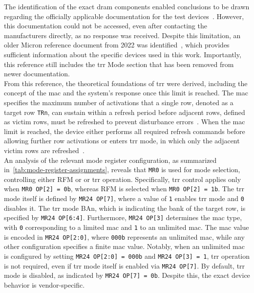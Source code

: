         The identification of the exact \gls{dram} components enabled conclusions to be drawn regarding the 
        officially applicable documentation for the test devices~\cite{datasheetHammerpi02, datasheetHammerpi03, datasheetHammerpi04, datasheetHammerpi05}. However, this 
        documentation could not be accessed, even after contacting the manufacturers directly, as no 
        response was received. Despite this limitation, an older Micron reference document from 2022 
        was identified~\cite{datasheetLPDDR4}, which provides sufficient information about the specific devices used 
        in this work. Importantly, this reference still includes the \gls{trr} Mode section that has been 
        removed from newer documentation.
        \\
        From this reference, the theoretical foundations of \gls{trr} were derived, including the concept 
        of the \gls{mac} and the system's response once this limit is reached. The 
        \gls{mac} specifies the maximum number of activations that a single row, denoted as a target row 
        \texttt{TRn}, can sustain within a refresh period before adjacent rows, defined as victim rows, 
        must be refreshed to prevent disturbance errors~\cite{datasheetLPDDR4}. When the \gls{mac} limit is reached, the device 
        either performs all required refresh commands before allowing further row activations or enters 
        \gls{trr} mode, in which only the adjacent victim rows are refreshed~\cite{datasheetLPDDR4}.
        \\
        An analysis of the relevant mode register configuration, as summarized in~\cref{tab:mode-register-assignments}, 
        reveals that \texttt{MR0} is used for mode selection, controlling either RFM or 
        or \gls{trr} operation. Specifically, \gls{trr} control applies only when \texttt{MR0 OP[2] = 0b}, whereas RFM is 
        selected when \texttt{MR0 OP[2] = 1b}. The \gls{trr} mode itself is defined by \texttt{MR24 OP[7]}, where 
        a value of \texttt{1} enables \gls{trr} mode and \texttt{0} disables it. The \gls{trr} mode BAn, which is 
        indicating the bank of the target row, is specified by \texttt{MR24 OP[6:4]}. Furthermore, 
        \texttt{MR24 OP[3]} determines the \gls{mac} type, with \texttt{0} corresponding to a limited \gls{mac} and 
        \texttt{1} to an unlimited \gls{mac}. The \gls{mac} value is encoded in \texttt{MR24 OP[2:0]}, where \texttt{000b} 
        represents an unlimited \gls{mac}, while any other configuration specifies a finite \gls{mac} value. Notably, 
        when an unlimited \gls{mac} is configured by setting \texttt{MR24 OP[2:0] = 000b} and 
        \texttt{MR24 OP[3] = 1}, \gls{trr} operation is not required, even if \gls{trr} mode itself is enabled via
        \texttt{MR24 OP[7]}. By default, \gls{trr} mode is disabled, as indicated by \texttt{MR24 OP[7] = 0b}. 
        Despite this, the exact device behavior is vendor-specific.

